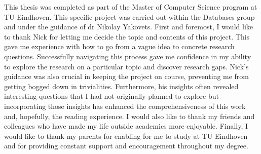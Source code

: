 This thesis was completed as part of the Master of Computer Science
program at TU Eindhoven. This specific project was carried out within the
Databases group and under the guidance of dr Nikolay Yakovets. First and
foremost, I would like to thank Nick for letting me decide the topic and
contents of this project. This gave me experience with how to go from a
vague idea to concrete research questions. Successfully navigating this process gave me
confidence in my ability to explore the research on a particular topic and
discover research gaps. Nick's guidance was also crucial in keeping the project
on course, preventing me from getting bogged down in trivialities. Furthermore, 
his insights often revealed interesting
questions that I had not originally planned to explore but incorporating those
insights has enhanced the comprehensiveness of this work and, hopefully, the
reading experience. I would also like to thank my friends and colleagues who have
made my life outside academics more enjoyable. Finally, I would like to thank my
parents for enabling for me to study at TU Eindhoven and for providing
constant support and encouragement throughout my degree.

